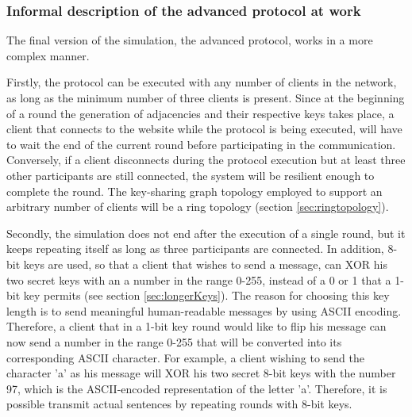 \subsubsection{Informal description of the advanced protocol at work}
\noindent The final version of the simulation, the advanced protocol, works in a more complex manner. 

Firstly, the protocol can be executed with any number of clients in the network, as long as the minimum number of three clients is present. Since at the beginning of a round the generation of adjacencies and their respective keys takes place, a client that connects to the website while the protocol is being executed, will have to wait the end of the current round before participating in the communication. Conversely, if a client disconnects during the protocol execution but at least three other participants are still connected, the system will be resilient enough to complete the round. The key-sharing graph topology employed to support an arbitrary number of clients will be a ring topology (section \ref{sec:ringtopology}). \newline

Secondly, the simulation does not end after the execution of a single round, but it keeps repeating itself as long as three participants are connected. In addition, 8-bit keys are used, so that a client that wishes to send a message, can XOR his two secret keys with an a number in the range 0-255, instead of a 0 or 1 that a 1-bit key permits (see section \ref{sec:longerKeys}). The reason for choosing this key length is to send meaningful human-readable messages by using ASCII encoding. Therefore, a client that in a 1-bit key round would like to flip his message can now send a number in the range 0-255 that will be converted into its corresponding ASCII character. For example, a client wishing to send the character 'a' as his message will XOR his two secret 8-bit keys with the number 97, which is the ASCII-encoded representation of the letter 'a'. Therefore, it is possible transmit actual sentences by repeating rounds with 8-bit keys. \newline

